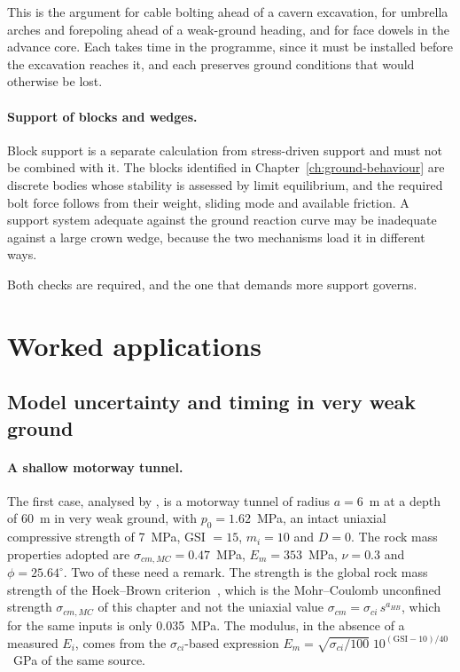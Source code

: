 This is the argument for cable bolting ahead of a cavern excavation, for
umbrella arches and forepoling ahead of a weak-ground heading, and for face
dowels in the advance core. Each takes time in the programme, since it must be installed
before the excavation reaches it, and each preserves ground conditions that
would otherwise be lost.

\paragraph{Support of blocks and wedges.}
Block support is a separate calculation from stress-driven support and must
not be combined with it. The blocks identified in
Chapter~\ref{ch:ground-behaviour} are discrete bodies whose stability is
assessed by limit equilibrium, and the required bolt force follows from their
weight, sliding mode and available friction. A support system adequate against
the ground reaction curve may be inadequate against a large crown
wedge, because the two mechanisms load it in different ways.

Both checks are required, and the one that demands more support governs.

\section{Worked applications}
\label{sec:applications-and-worked-examples}

\subsection{Model uncertainty and timing in very weak ground}
\label{sec:weak-ground-case}

\paragraph{A shallow motorway tunnel.}
The first case, analysed by \citet{vrakas2014finite}, is a motorway tunnel of
radius $a = 6$~m at a depth of 60~m in very weak ground, with $p_0 = 1.62$~MPa, an intact uniaxial compressive
strength of 7~MPa, GSI $= 15$, $m_i = 10$ and $D = 0$. The rock mass
properties adopted are $\sigma_{cm,MC} = 0.47$~MPa, $E_m = 353$~MPa,
$\nu = 0.3$ and $\phi = 25.64^\circ$. Two of these need a remark. The
strength is the global rock mass strength of the Hoek--Brown
criterion~\citep{hoek2002hb}, which is the Mohr--Coulomb unconfined strength
$\sigma_{cm,MC}$ of this chapter and not the uniaxial value
$\sigma_{cm} = \sigma_{ci}\,s^{a_{HB}}$, which for the same inputs is only
0.035~MPa. The modulus, in the absence of a measured $E_i$, comes from the
$\sigma_{ci}$-based expression
$E_m = \sqrt{\sigma_{ci}/100}\;10^{(\mathrm{GSI}-10)/40}$~GPa of the same
source.

